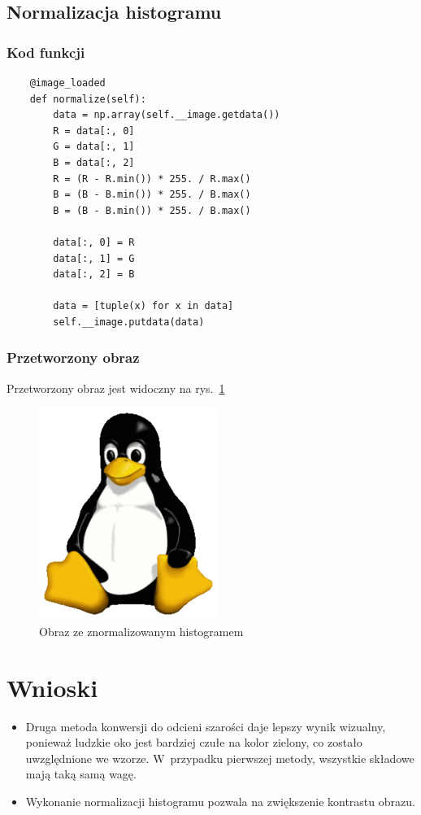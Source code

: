 \documentclass[12pt,a4paper]{article}
\begin{document}
\subsection{Normalizacja histogramu}
\subsubsection{Kod funkcji}
\begin{lstlisting}
    @image_loaded
    def normalize(self):
        data = np.array(self.__image.getdata())
        R = data[:, 0]
        G = data[:, 1]
        B = data[:, 2]
        R = (R - R.min()) * 255. / R.max()
        B = (B - B.min()) * 255. / B.max()
        B = (B - B.min()) * 255. / B.max()

        data[:, 0] = R
        data[:, 1] = G
        data[:, 2] = B

        data = [tuple(x) for x in data]
        self.__image.putdata(data)
\end{lstlisting}
\subsubsection{Przetworzony obraz}
Przetworzony obraz jest widoczny na rys.~\ref{fig:norm}
\begin{figure}[ht]
\includegraphics{normalize}
\caption{Obraz ze znormalizowanym histogramem}
\label{fig:norm}
\end{figure}
\section{Wnioski}
\begin{itemize}
\item Druga metoda konwersji do odcieni szarości daje lepszy wynik wizualny, ponieważ ludzkie oko jest bardziej czułe na kolor zielony, co zostało uwzględnione we wzorze.
W~przypadku pierwszej metody, wszystkie składowe mają taką samą wagę.
\item Wykonanie normalizacji histogramu pozwala na zwiększenie kontrastu obrazu.
\end{itemize}
\end{document}
